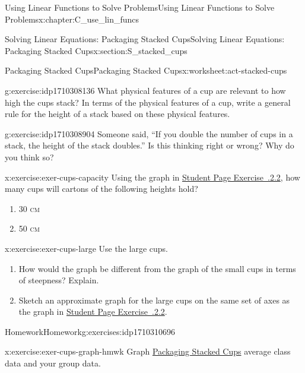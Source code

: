 \documentclass[oneside,10pt,]{book}
\newcommand{\xreffont}{\relax}
\newcommand{\initialism}[1]{\textsc{\MakeLowercase{#1}}}
\numberwithin{equation}{chapter}
\begin{document}
\begin{chapterptx}{Using Linear Functions to Solve Problems}{}{Using Linear Functions to Solve Problems}{}{}{x:chapter:C_use_lin_funcs}
\begin{sectionptx}{Solving Linear Equations: Packaging Stacked Cups}{}{Solving Linear Equations: Packaging Stacked Cups}{}{}{x:section:S_stacked_cups}
\begin{worksheet-subsection}{Packaging Stacked Cups}{}{Packaging Stacked Cups}{}{}{x:worksheet:act-stacked-cups}
\begin{divisionexercise}{5}{}{}{g:exercise:idp1710308136}%
What physical features of a cup are relevant to how high the cups stack? In terms of the physical features of a cup, write a general rule for the height of a stack based on these physical features.%
\end{divisionexercise}%
\begin{divisionexercise}{6}{}{}{g:exercise:idp1710308904}%
Someone said, ``If you double the number of cups in a stack, the height of the stack doubles.'' Is this thinking right or wrong? Why do you think so?%
\end{divisionexercise}%
\begin{divisionexercise}{7}{}{}{x:exercise:exer-cups-capacity}%
Using the graph in \hyperlink{x:exercise:exer-cups-graph}{Student Page Exercise~{\xreffont 3.2.2.2}}, how many cups will cartons of the following heights hold?%
\begin{enumerate}[font=\bfseries,label=(\alph*),ref=\alph*]
\item{}30 \initialism{cm}%
\item{}50 \initialism{cm}%
\end{enumerate}
\end{divisionexercise}%
\begin{divisionexercise}{8}{}{}{x:exercise:exer-cups-large}%
Use the large cups.%
\begin{enumerate}[font=\bfseries,label=(\alph*),ref=\alph*]
\item{}How would the graph be different from the graph of the small cups in terms of steepness? Explain.%
\item{}Sketch an approximate graph for the large cups on the same set of axes as the graph in \hyperlink{x:exercise:exer-cups-graph}{Student Page Exercise~{\xreffont 3.2.2.2}}.%
\end{enumerate}
\end{divisionexercise}%
\end{worksheet-subsection}
\restoregeometry
%
%
\typeout{************************************************}
\typeout{************************************************}
%
\begin{exercises-subsection}{Homework}{}{Homework}{}{}{g:exercises:idp1710310696}
\begin{divisionexercise}{1}{}{}{x:exercise:exer-cups-graph-hmwk}%
Graph \hyperref[x:worksheet:act-stacked-cups]{Packaging Stacked Cups} average class data and your group data.%
\begin{enumerate}[font=\bfseries,label=(\alph*),ref=\alph*]

\end{enumerate}
\end{divisionexercise}
\end{exercises-subsection}
\end{sectionptx}
\end{chapterptx}
\end{document}
